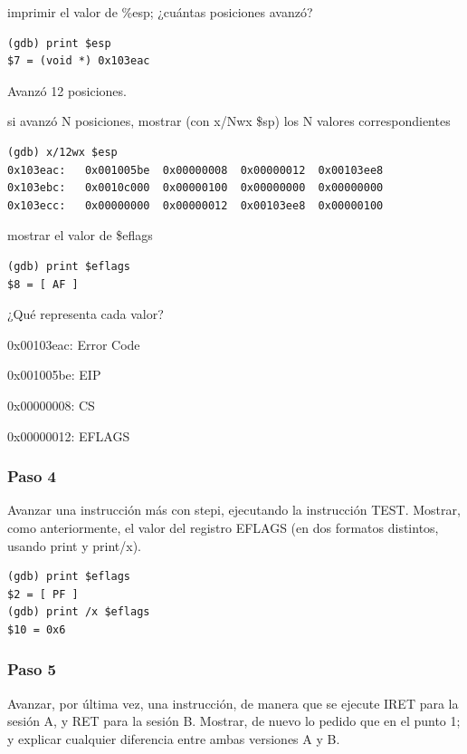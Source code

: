 \documentclass[a4paper]{article}
\begin{document}
\begin{list}{•}
\item imprimir el valor de \%esp; ¿cuántas posiciones avanzó?
\begin{lstlisting}
(gdb) print $esp
$7 = (void *) 0x103eac
\end{lstlisting}
Avanzó 12 posiciones.

\item si avanzó N posiciones, mostrar (con x/Nwx \$sp) los N valores correspondientes
\begin{lstlisting}
(gdb) x/12wx $esp
0x103eac:	0x001005be	0x00000008	0x00000012	0x00103ee8
0x103ebc:	0x0010c000	0x00000100	0x00000000	0x00000000
0x103ecc:	0x00000000	0x00000012	0x00103ee8	0x00000100
\end{lstlisting}

\item mostrar el valor de \$eflags
\begin{lstlisting}
(gdb) print $eflags
$8 = [ AF ]
\end{lstlisting}

\item ¿Qué representa cada valor?
\begin{list}{•}{}
\item 0x00103eac: Error Code
\item 0x001005be: EIP
\item 0x00000008: CS
\item 0x00000012: EFLAGS
\end{list}

\end{list}

\subsubsection*{Paso 4} Avanzar una instrucción más con stepi, ejecutando la instrucción TEST. Mostrar, como anteriormente, el valor del registro EFLAGS (en dos formatos distintos, usando print y print/x).\newline

\begin{lstlisting}
(gdb) print $eflags
$2 = [ PF ]
(gdb) print /x $eflags
$10 = 0x6

\end{lstlisting}

\subsubsection*{Paso 5}
Avanzar, por última vez, una instrucción, de manera que se ejecute IRET para la sesión A, y RET para la sesión B. Mostrar, de nuevo lo pedido que en el punto 1; y explicar cualquier diferencia entre ambas versiones A y B.
\end{document}
